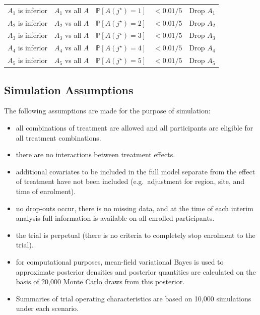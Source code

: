 \documentclass[
]{article}
\providecommand{\tightlist}{%
  \setlength{\itemsep}{0pt}\setlength{\parskip}{0pt}}
\begin{document}
\begin{table}[H]
\begin{tabular}[t]{lllll}
$A_1$ is inferior & $A_1$ vs all $A$ & $\mathbb P[A(j^\star)=1]$ & $<0.01/5$ & Drop $A_1$\\
$A_2$ is inferior & $A_2$ vs all $A$ & $\mathbb P[A(j^\star)=2]$ & $<0.01/5$ & Drop $A_2$\\
$A_3$ is inferior & $A_3$ vs all $A$ & $\mathbb P[A(j^\star)=3]$ & $<0.01/5$ & Drop $A_3$\\
$A_4$ is inferior & $A_4$ vs all $A$ & $\mathbb P[A(j^\star)=4]$ & $<0.01/5$ & Drop $A_4$\\
$A_5$ is inferior & $A_5$ vs all $A$ & $\mathbb P[A(j^\star)=5]$ & $<0.01/5$ & Drop $A_5$\\
\bottomrule
\end{tabular}
\end{table}

\hypertarget{simulation-assumptions}{%
\subsection{Simulation Assumptions}\label{simulation-assumptions}}

The following assumptions are made for the purpose of simulation:

\begin{itemize}
\tightlist
\item
  all combinations of treatment are allowed and all participants are eligible for all treatment combinations.
\item
  there are no interactions between treatment effects.
\item
  additional covariates to be included in the full model separate from the effect of treatment have not been included (e.g.~adjustment for region, site, and time of enrolment).
\item
  no drop-outs occur, there is no missing data, and at the time of each interim analysis full information is available on all enrolled participants.
\item
  the trial is perpetual (there is no criteria to completely stop enrolment to the trial).
\item
  for computational purposes, mean-field variational Bayes is used to approximate posterior densities and posterior quantities are calculated on the basis of 20,000 Monte Carlo draws from this posterior.
\item
  Summaries of trial operating characteristics are based on 10,000 simulations under each scenario.
\end{itemize}
\end{document}
